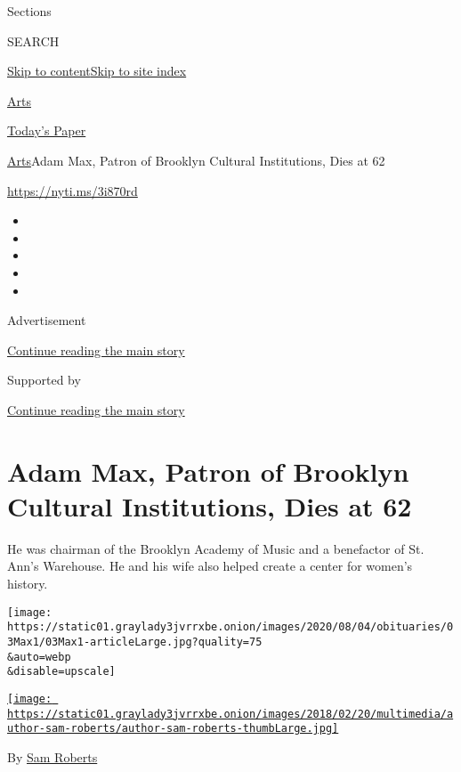 Sections

SEARCH

\protect\hyperlink{site-content}{Skip to
content}\protect\hyperlink{site-index}{Skip to site index}

\href{https://www.nytimes3xbfgragh.onion/section/arts}{Arts}

\href{https://myaccount.nytimes3xbfgragh.onion/auth/login?response_type=cookie\&client_id=vi}{}

\href{https://www.nytimes3xbfgragh.onion/section/todayspaper}{Today's
Paper}

\href{/section/arts}{Arts}\textbar{}Adam Max, Patron of Brooklyn
Cultural Institutions, Dies at 62

\url{https://nyti.ms/3i870rd}

\begin{itemize}
\item
\item
\item
\item
\item
\end{itemize}

Advertisement

\protect\hyperlink{after-top}{Continue reading the main story}

Supported by

\protect\hyperlink{after-sponsor}{Continue reading the main story}

\hypertarget{adam-max-patron-of-brooklyn-cultural-institutions-dies-at-62}{%
\section{Adam Max, Patron of Brooklyn Cultural Institutions, Dies at
62}\label{adam-max-patron-of-brooklyn-cultural-institutions-dies-at-62}}

He was chairman of the Brooklyn Academy of Music and a benefactor of St.
Ann's Warehouse. He and his wife also helped create a center for women's
history.

\texttt{[image: https://static01.graylady3jvrrxbe.onion/images/2020/08/04/obituaries/03Max1/03Max1-articleLarge.jpg?quality=75\\\&auto=webp\\\&disable=upscale]}

\href{https://www.nytimes3xbfgragh.onion/by/sam-roberts}{\texttt{[image: https://static01.graylady3jvrrxbe.onion/images/2018/02/20/multimedia/author-sam-roberts/author-sam-roberts-thumbLarge.jpg]}}

By \href{https://www.nytimes3xbfgragh.onion/by/sam-roberts}{Sam Roberts}

